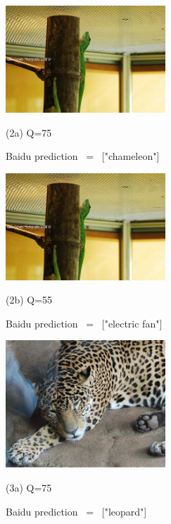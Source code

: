 \begin{figure}[htbp]
	\vfill	
	\begin{minipage}{0.5\linewidth}
		\centerline{\includegraphics[width=6.0cm, trim=0 0 0 0]{figures/chameleon_q75.jpeg}}
		\centerline{(2a) Q=75}
		\centerline{Baidu prediction \ = \ ["chameleon"]}
		\vspace{0.4cm}
	\end{minipage}
	\hfill
	\begin{minipage}{0.5\linewidth}
		\centerline{\includegraphics[width=6.0cm, trim=0 0 0 0]{figures/chameleon_q55.jpeg}}
		\centerline{(2b) Q=55}
 		\centerline{Baidu prediction \ = \ ["electric fan"]}
 		\vspace{0.4cm}
	\end{minipage}
	\vfill
	\begin{minipage}{0.5\linewidth}
		\centerline{\includegraphics[width=6.0cm, trim=0 0 0 0, clip]{figures/tiger_highq.jpeg}}
		\centerline{(3a) Q=75}
		\centerline{Baidu prediction \ = \ ["leopard"]}
		\vspace{0.3cm}
	\end{minipage}
	\hfill
	\begin{minipage}{0.5\linewidth}

\end{minipage}
\end{figure}
